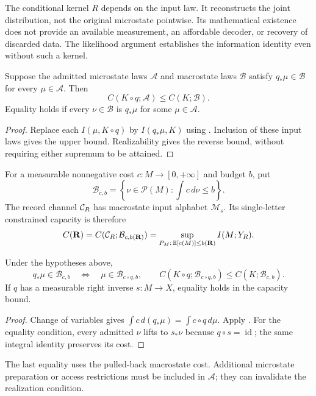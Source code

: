 The conditional kernel $R$ depends on the input law. It reconstructs
the joint distribution, not the original microstate pointwise. Its
mathematical existence does not provide an available measurement,
an affordable decoder, or recovery of discarded data. The likelihood
argument establishes the information identity even without such a kernel.

\begin{theorem}
\label{thm:input-capacity}
Suppose the admitted microstate laws
$\mathcal A$ and macrostate laws $\mathcal B$ satisfy
$q_*\mu\in\mathcal B$ for every $\mu\in\mathcal A$. Then
\[
 C(K\circ q;\mathcal A)\le C(K;\mathcal B).
\]
Equality holds if every $\nu\in\mathcal B$ is $q_*\mu$ for some
$\mu\in\mathcal A$.
\end{theorem}
\begin{proof}
Replace each $I(\mu,K\circ q)$ by $I(q_*\mu,K)$ using
. Inclusion of these input laws gives
the upper bound. Realizability gives the reverse bound, without
requiring either supremum to be attained.
\end{proof}

For a measurable nonnegative cost $c:M\to[0,+\infty]$ and budget $b$,
put
\[
 \mathcal B_{c,b}=\left\{\nu\in\mathcal P(M):\int c\,d\nu\le b\right\}.
\]
The record channel $\mathcal{C}_R$ has macrostate input alphabet
$\mathcal M_s$. Its single-letter constrained capacity is therefore
\begin{equation}\label{eq:channel-capacity}
 C(\mathbf{R})
 =C(\mathcal{C}_R;\mathcal B_{c,b(\mathbf{R})})
 =\sup_{P_M:\,\mathbb E[c(M)]\le b(\mathbf{R})}I(M;Y_R).
\end{equation}

\begin{corollary}
\label{cor:capacity-cost}
Under the hypotheses above,
\[
 q_*\mu\in\mathcal B_{c,b}
 \quad\Longleftrightarrow\quad
 \mu\in\mathcal B_{c\circ q,b},\qquad
 C(K\circ q;\mathcal B_{c\circ q,b})\le C(K;\mathcal B_{c,b}).
\]
If $q$ has a measurable right inverse $s:M\to X$, equality holds
in the capacity bound.
\end{corollary}
\begin{proof}
Change of variables gives $\int c\,d(q_*\mu)=\int c\circ q\,d\mu$.
Apply . For the equality condition, every
admitted $\nu$ lifts to $s_*\nu$ because $q\circ s=\operatorname{id}$;
the same integral identity preserves its cost.
\end{proof}

The last equality uses the pulled-back macrostate cost. Additional
microstate preparation or access restrictions must be included in
$\mathcal A$; they can invalidate the realization condition.
